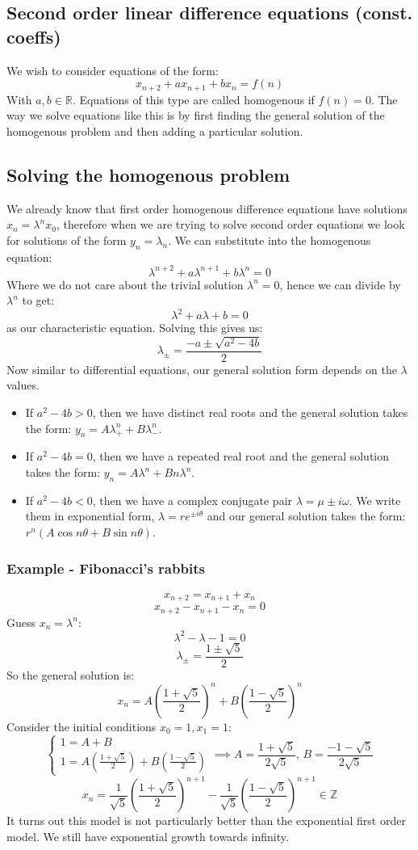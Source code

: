 \documentclass[12pt]{article}
\begin{document}
\subsection*{Second order linear difference equations (const. coeffs)}
We wish to consider equations of the form:
\[x_{n+2}+ax_{n+1}+bx_n=f(n)\]
With \(a,b\in\mathbb{R}\). Equations of this type are called homogenous if \(f(n)=0\). The way we solve equations like this is by first finding the general solution of the homogenous problem and then adding a particular solution.
\subsection*{Solving the homogenous problem}
We already know that first order homogenous difference equations have solutions \(x_n=\lambda^nx_0\), therefore when we are trying to solve second order equations we look for solutions of the form \(y_n=\lambda_n\). We can substitute into the homogenous equation:
\[\lambda^{n+2}+a\lambda^{n+1}+b\lambda^n=0\]
Where we do not care about the trivial solution \(\lambda^n=0\), hence we can divide by \(\lambda^n\) to get:
\[\lambda^2+a\lambda+b=0\]
as our characteristic equation. Solving this gives us:
\[\lambda_\pm=\frac{-a\pm\sqrt{a^2-4b}}{2}\]
Now similar to differential equations, our general solution form depends on the \(\lambda\) values.
\begin{itemize}
    \item If \(a^2-4b>0\), then we have distinct real roots and the general solution takes the form: \(y_n=A\lambda_+^n+B\lambda_-^n\).
    \item If \(a^2-4b=0\), then we have a repeated real root and the general solution takes the form: \(y_n=A\lambda^n+Bn\lambda^n\).
    \item If \(a^2-4b<0\), then we have a complex conjugate pair \(\lambda=\mu\pm i\omega\). We write them in exponential form, \(\lambda=re^{\pm i\theta}\) and our general solution takes the form: \(r^n(A\cos{n\theta}+B\sin{n\theta})\).
\end{itemize}
\subsubsection*{Example - Fibonacci's rabbits}
\[x_{n+2}=x_{n+1}+x_{n}\]
\[x_{n+2}-x_{n+1}-x_n=0\]
Guess \(x_n=\lambda^n\):
\[\lambda^2-\lambda-1=0\]
\[\lambda_{\pm}=\frac{1\pm\sqrt{5}}{2}\]
So the general solution is:
\[x_n=A\left(\frac{1+\sqrt{5}}{2}\right)^n+B\left(\frac{1-\sqrt{5}}{2}\right)^n\]
Consider the initial conditions \(x_0=1, x_1=1\):
\[\begin{cases}
    1=A+B \\
    1=A\left(\frac{1+\sqrt{5}}{2}\right)+B\left(\frac{1-\sqrt{5}}{2}\right)
\end{cases}\implies A=\frac{1+\sqrt{5}}{2\sqrt{5}},\, B=\frac{-1-\sqrt{5}}{2\sqrt{5}}\]
\[x_n=\frac{1}{\sqrt{5}}\left(\frac{1+\sqrt{5}}{2}\right)^{n+1}-\frac{1}{\sqrt{5}}\left(\frac{1-\sqrt{5}}{2}\right)^{n+1}\in\mathbb{Z}\]
It turns out this model is not particularly better than the exponential first order model. We still have exponential growth towards infinity.
\end{document}
